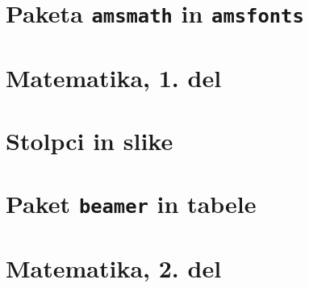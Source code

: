\documentclass{beamer}
\begin{document}
\section{Paketa \texttt{amsmath} in \texttt{amsfonts}}

\section[Matematika, 1. del\\\large{Analiza, logika, množice}]{Matematika, 1. del}

\section{Stolpci in slike}

\section{Paket \texttt{beamer} in tabele}

\section[Matematika, 2. del\\\large{Zaporedja, algebra, grupe}]{Matematika, 2. del}
\end{document}
